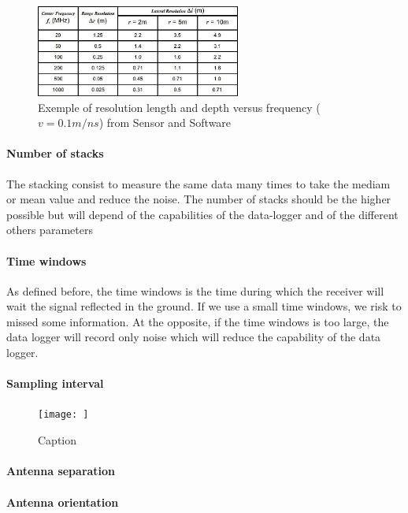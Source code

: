 \begin{figure}[h]
    \centering
    \includegraphics[width=0.6\textwidth]{Images/00_Theory/SS_FrequencyDepthResolution.jpg}
    \caption{Exemple of resolution length and depth versus frequency ($v=0.1m/ns$) from Sensor and Software \cite{UnderstandingDetection}}
    \label{fig:GPRFrequency}
\end{figure}

\paragraph{Number of stacks} The stacking consist to measure the same data many times to take the mediam or mean value and reduce the noise. The number of stacks should be the higher possible but will depend of the capabilities of the data-logger and of the different others parameters

\paragraph{Time windows} As defined before, the time windows is the time during which the receiver will wait the signal reflected in the ground. If we use a small time windows, we risk to missed some information. At the opposite, if the time windows is too large, the data logger will record only noise which will reduce the capability of the data logger.

\paragraph{Sampling interval}

\begin{figure}
    \centering
    \texttt{[image: ]}
    \caption{Caption}
    \label{fig:my_label}
\end{figure}

\paragraph{Antenna separation}

\paragraph{Antenna orientation}

